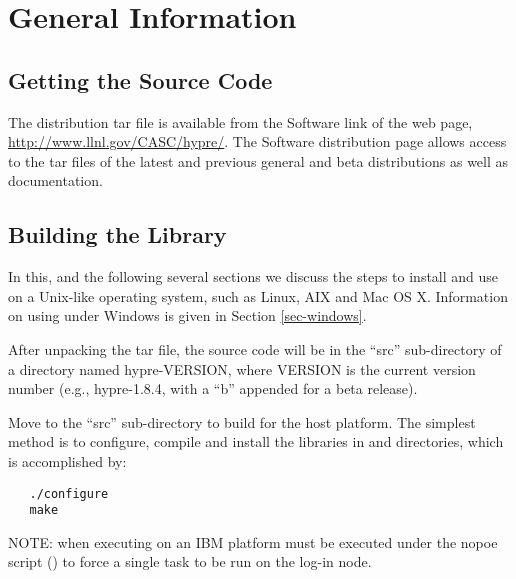 
\chapter{General Information}


\section{Getting the Source Code}

The \hypre{} distribution tar file is available from the Software link of the
\hypre{} web page, \url{http://www.llnl.gov/CASC/hypre/}.  The \hypre{} Software
distribution page allows access to the tar files of the latest and previous
general and beta distributions as well as documentation.


\section{Building the Library}

In this, and the following several sections we discuss the steps to install
and use \hypre{} on a Unix-like operating system, such as Linux, AIX and Mac
OS X. Information on using \hypre{} under Windows is given in Section
\ref{sec-windows}.

After unpacking the \hypre{} tar file, the source code will be in the ``src''
sub-directory of a directory named hypre-VERSION, where VERSION is the current
version number (e.g., hypre-1.8.4, with a ``b'' appended for a beta release).

Move to the ``src'' sub-directory to build \hypre{} for the host platform.  The
simplest method is to configure, compile and install the libraries in
 and  directories, which is accomplished
by:
\begin{verbatim}
   ./configure
   make
\end{verbatim}

NOTE: when executing on an IBM platform  must be executed under
the nopoe script () to force a
single task to be run on the log-in node.

